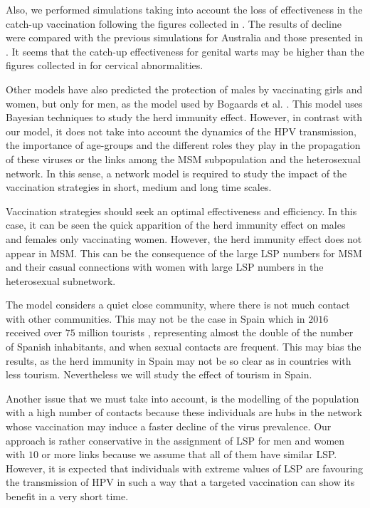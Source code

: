 Also, we performed simulations taking into account the loss of effectiveness in the catch-up vaccination following the figures collected in \cite{Skufca}. The results of decline were compared with the previous simulations for Australia and those presented in \cite{ali2013genital}. It seems that the catch-up effectiveness for genital warts may be higher than the figures collected in \cite{Skufca} for cervical abnormalities.  

Other models have also predicted the protection of males by vaccinating girls and women, but only for men, as the model used by Bogaards et al. \cite{bogaards2015direct}. This model uses Bayesian techniques to study the herd immunity effect. However, in contrast with our model, it does not take into account the dynamics of the HPV transmission, the importance of age-groups and the different roles they play in the propagation of these viruses or the links among the MSM subpopulation and the heterosexual network. In this sense, a network model is required to study the impact of the vaccination strategies in short, medium and long time scales.

Vaccination strategies should seek an optimal effectiveness and efficiency. In this case, it can be seen the quick apparition of the herd immunity effect on males and females only vaccinating women. However, the herd immunity effect does not appear in  MSM. This can be the consequence of the large LSP numbers for MSM and their casual connections with women with large LSP numbers in the heterosexual subnetwork.

The model considers a quiet close community, where there is not much contact with other communities. This may not be the case in Spain which in $2016$ received over $75$ million tourists \cite{INEturismo}, representing almost the double of the number of Spanish inhabitants, and when sexual contacts are frequent. This may bias the results, as the herd immunity in Spain may not be so clear as in countries with less tourism. Nevertheless we will study the effect of tourism in Spain.

Another issue that we must take into account, is the modelling of the population with a high number of contacts because these individuals are hubs in the network whose vaccination may induce a faster decline of the virus prevalence. Our approach is rather conservative in the assignment of LSP for men and women with $10$ or more links because we assume that all of them have similar LSP. However, it is expected that individuals with extreme values of LSP are favouring the transmission of HPV in such a way that  a targeted vaccination can show its benefit in a very short time.
